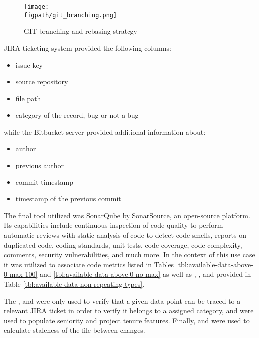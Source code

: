 \begin{figure}[!h]
    \centering
    \texttt{[image: \\figpath/git\_branching.png]}
    \caption{GIT branching and rebasing strategy}
    \label{fig:git-branching-merging-and-rebasing}
\end{figure}

JIRA ticketing system provided the following columns:
\begin{itemize}
    \item issue key
    \item source repository
    \item file path
    \item category of the record, bug or not a bug
\end{itemize}

while the Bitbucket server provided additional information about:
\begin{itemize}\label{lst:design:info-from-bitbucket}
    \item author
    \item previous author
    \item commit timestamp
    \item timestamp of the previous commit
\end{itemize}

The final tool utilized was SonarQube by SonarSource, an open-source platform. Its capabilities include continuous inspection of code quality to perform automatic reviews with static analysis of code to detect code smells, reports on duplicated code, coding standards, unit tests, code coverage, code complexity, comments,  security vulnerabilities, and much more. In the context of this use case it was utilized to associate code metrics listed in Tables \ref{tbl:available-data-above-0-max-100} and \ref{tbl:available-data-above-0-no-max} as well as \files{}, \sqaleDebt{}, \statements{} and \violations{} provided in Table \ref{tbl:available-data-non-repeating-types}.

The \issueKey{}, \sourceRepository{} and \filePath{} were only used to verify that a given data point can be traced to a relevant JIRA ticket in order to verify it belongs to a assigned category, \authorAttrib{} and \prevAuthorAttrib{} were used to populate seniority and project tenure features. Finally, \timestamp{} and \prevTimestamp{} were used to calculate staleness of the file between changes.

